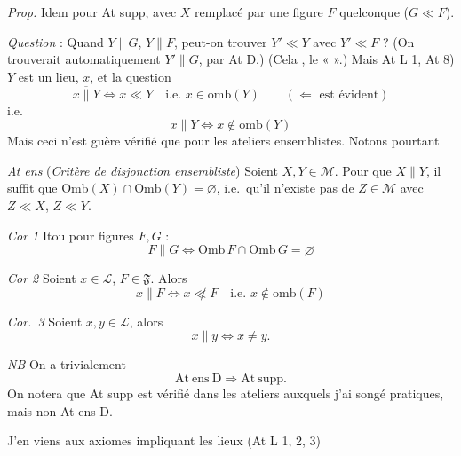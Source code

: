 \documentclass[11pt,a4paper]{article}
\begin{document}
\emph{Prop.} \quad Idem pour At supp, avec $X$ remplacé par une figure $F$ quelconque ($G \ll F$).

\emph{Question} : Quand $Y \parallel G$, $Y \mathrel{\overline{\parallel}} F$, peut-on trouver $Y' \ll Y$ avec $Y' \ll F$ ? (On trouverait  automatiquement $Y' \parallel G$, par At D.) (Cela  \struck{\ill{}} \ill{} , le « \ill{} \ill{} ».) Mais  At L 1,  At 8) \ill{} \ill{} \ill{} \ill{} $Y$ est un lieu,  $x$, et \ill{} la  question
\[
  x \mathrel{\overline{\parallel}} Y \Longleftrightarrow x \ll Y \quad \text{i.e.\ } x \in \mathrm{omb}(Y) \qquad (\Longleftarrow \text{ est évident})
\]
i.e.
\[
  x \parallel Y \Longleftrightarrow x \notin \mathrm{omb}(Y)
\]
Mais ceci n'est guère vérifié que pour les ateliers ensemblistes. Notons pourtant

\emph{At ens}  (\emph{Critère de disjonction ensembliste})  Soient $X, Y \in \mathcal{M}$. Pour que $X \parallel Y$, il   suffit que \struck{\ill{}} $\mathrm{Omb}(X) \cap \mathrm{Omb}(Y) = \varnothing$, i.e.\ qu'il n'existe pas de $Z \in \mathcal{M}$ avec $Z \ll X$, $Z \ll Y$.

\emph{Cor 1} \quad Itou pour figures $F, G$ :
\[
  F \parallel G \Longleftrightarrow \mathrm{Omb}\, F \cap \mathrm{Omb}\, G = \varnothing
\]

\emph{Cor 2} \quad Soient $x \in \mathcal{L}$, $F \in \mathfrak{F}$. Alors
\[
  x \parallel F \Longleftrightarrow x \not\ll F \quad \text{i.e.\ } x \notin \mathrm{omb}(F)
\]

\emph{Cor.\ 3} \quad Soient $x, y \in \mathcal{L}$, alors
\[
  x \parallel y \Longleftrightarrow x \neq y .
\]

\emph{NB} \quad On a trivialement
\[
  \mathrm{At\ ens\ D} \Longrightarrow \mathrm{At\ supp} .
\]
On notera que At supp est vérifié dans les ateliers auxquels j'ai songé  pratiques, mais non At ens D.


J'en viens aux axiomes impliquant les lieux (At L 1, 2, 3)
\end{document}
